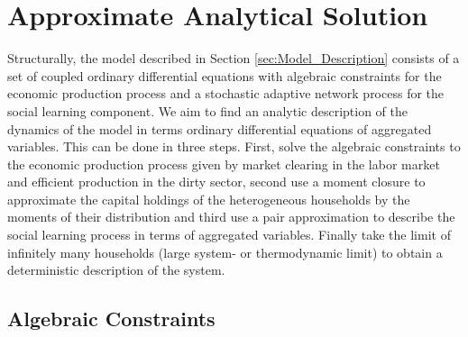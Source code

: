 \section{Approximate Analytical Solution}

Structurally, the model described in Section \ref{sec:Model_Description} consists of a set of coupled ordinary differential equations with algebraic constraints for the economic production process and a stochastic adaptive network process for the social learning component.
We aim to find an analytic description of the dynamics of the model in terms ordinary differential equations of aggregated variables. This can be done in three steps. First, solve the algebraic constraints to the economic production process given by market clearing in the labor market and efficient production in the dirty sector, second use a moment closure to approximate the capital holdings of the heterogeneous households by the moments of their distribution and third use a pair approximation to describe the social learning process in terms of aggregated variables. Finally take the limit of infinitely many households (large system- or thermodynamic limit) to obtain a deterministic description of the system.

\subsection{Algebraic Constraints}


